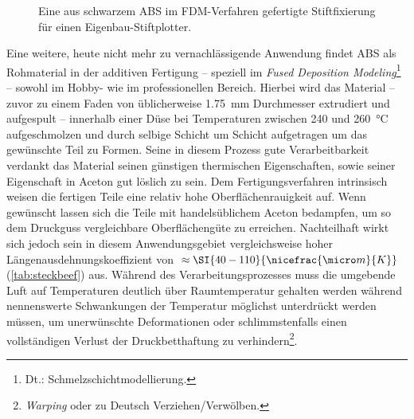             \begin{figure}
                \centering
                \caption[Eine aus schwarzem ABS im FDM-Verfahren gefertigte Stiftfixierung]{Eine aus schwarzem ABS im FDM-Verfahren gefertigte Stiftfixierung für einen Eigenbau-Stiftplotter.}%
                \label{fig:3dDruck ABS teil}
            \end{figure}
            Eine weitere, heute nicht mehr zu vernachlässigende Anwendung findet ABS als Rohmaterial in der additiven Fertigung
             – speziell im \textit{Fused Deposition Modeling}\footnote{Dt.: Schmelzschichtmodellierung.} – sowohl im Hobby-
            wie im professionellen Bereich. Hierbei wird das Material – zuvor zu einem Faden von üblicherweise \SI{1,75}{mm}
            Durchmesser extrudiert und aufgespult – innerhalb einer Düse bei Temperaturen zwischen \SI{240}{} und \SI{260}{\celsius} aufgeschmolzen
            und durch selbige Schicht um Schicht aufgetragen um das gewünschte Teil zu Formen. Seine in diesem Prozess gute
            Verarbeitbarkeit verdankt das Material seinen günstigen thermischen Eigenschaften, sowie seiner Eigenschaft in
            Aceton gut löslich zu sein. Dem Fertigungsverfahren intrinsisch weisen die fertigen Teile eine relativ hohe
            Oberflächenrauigkeit auf. Wenn gewünscht lassen sich die Teile mit handelsüblichem Aceton bedampfen, um so
            dem Druckguss vergleichbare Oberflächengüte zu erreichen. Nachteilhaft wirkt sich jedoch sein in diesem Anwendungsgebiet
            vergleichsweise hoher Längenausdehnungskoeffizient von \(\approx \SI{40-110}{\nicefrac{\micro m}{K}}\) (\cref{tab:steckbeef}) aus. Während des Verarbeitungsprozesses muss die umgebende Luft
            auf Temperaturen deutlich über Raumtemperatur gehalten werden während nennenswerte Schwankungen der Temperatur
            möglichst unterdrückt werden müssen, um unerwünschte Deformationen oder schlimmstenfalls einen vollständigen
            Verlust der Druckbetthaftung zu verhindern\footnote{\textit{Warping} oder zu Deutsch Verziehen/Verwölben.}.

